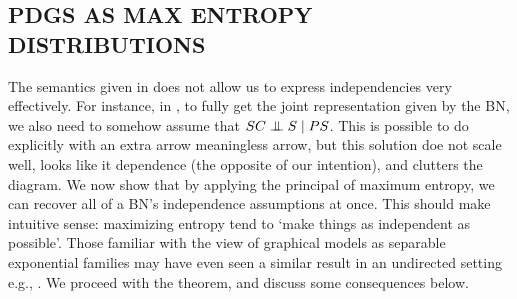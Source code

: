 \documentclass{article}
\newcommand\SD{_{\text{SD}}}
\newcommand{\MN}{PDG}
\numberwithin{equation}{section}
\begin{document}


	\subsection{\MN S AS MAX ENTROPY DISTRIBUTIONS} \label{sec:maxent-semantics}
	

	The semantics given in  does not allow us to express independencies very effectively.
	For instance, in , to fully get the joint representation given by the BN, we also need to somehow assume that $SC \mathrel{\perp\mspace{-10mu}\perp} S \mid PS$. This is possible to do explicitly with an extra arrow meaningless arrow, but this solution doe not scale well, looks like it dependence (the opposite of our intention), and clutters the diagram. 
	We now show that by applying the principal of maximum entropy, we can recover all of a BN's independence assumptions at once. This should make intuitive sense: maximizing entropy tend to `make things as independent as possible'. 
	Those familiar with the view of graphical models as separable exponential families may have even seen a similar result in an undirected setting e.g., \parencite[cf.][pp. 37-39]{wainwright2008graphical}. 
	We proceed with the theorem, and discuss some consequences below.
	
\end{document}
